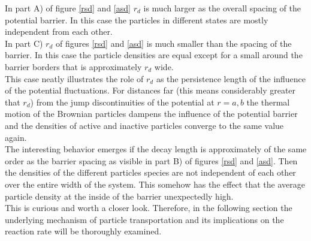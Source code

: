 In part A) of figure \ref{rsd} and \ref{asd} $r_d$ is much larger as the overall spacing of the potential barrier. In this case the particles in different states are mostly independent from each other. \\
In part C) $r_d$ of figures \ref{rsd} and \ref{asd} is much smaller than the spacing of the barrier. In this case the particle densities are equal except for a small around the barrier borders that is approximately $r_d$ wide.\\ 
This case neatly illustrates the role of $r_d$ as the persistence length of the influence of the potential fluctuations. For distances far (this means considerably greater that $r_d$) from the jump discontinuities of the potential at  $r=a,b$ the thermal motion of the Brownian particles dampens the influence of the potential barrier and the densities of active and inactive particles converge to the same value again.\\
The interesting behavior emerges if the decay length is approximately of the same order as the barrier spacing as visible in part B) of figures \ref{rsd} and \ref{asd}. Then the densities of the different particles species are not independent of each other over the entire width of the system. This somehow has the effect that the average particle density at the inside of the barrier unexpectedly high. \\
This is curious and worth a closer look. Therefore, in the following section the underlying mechanism of particle transportation and its implications on the reaction rate will be thoroughly examined. \\ 
\newpage


